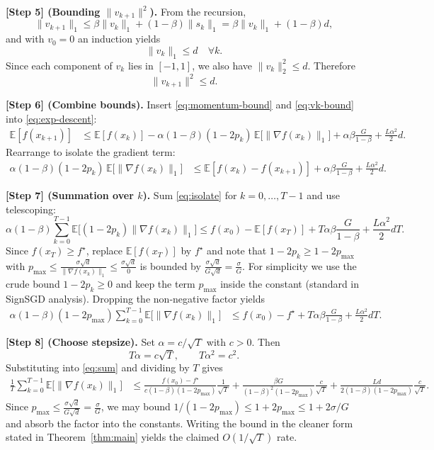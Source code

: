 \documentclass[11pt]{article}
\begin{document}
\bigskip
\noindent\textbf{[Step 5] (Bounding $\|v_{k+1}\|^{2}$).}  
From the recursion,
\[
\|v_{k+1}\|_{1}\le \beta\|v_{k}\|_{1}+(1-\beta)\|s_{k}\|_{1}
               =\beta\|v_{k}\|_{1}+(1-\beta)d,
\]
and with $v_0=0$ an induction yields
\[
\|v_{k}\|_{1}\le d\quad\forall k.
\]
Since each component of $v_k$ lies in $[-1,1]$, we also have $\|v_k\|_{2}^{2}\le d$. Therefore
\[
\|v_{k+1}\|^{2}\le d.\label{eq:vk-bound}
\]

\bigskip
\noindent\textbf{[Step 6] (Combine bounds).}  
Insert \eqref{eq:momentum-bound} and \eqref{eq:vk-bound} into \eqref{eq:exp-descent}:
\begin{align}
\mathbb{E}[f(x_{k+1})] 
&\le \mathbb{E}[f(x_k)]
   -\alpha(1-\beta)(1-2p_k)\,\mathbb{E}\!\big[\|\nabla f(x_k)\|_1\big]
   +\alpha\beta\frac{G}{1-\beta}
   +\frac{L\alpha^{2}}{2}d . \label{eq:combined}
\end{align}
Rearrange to isolate the gradient term:
\begin{align}
\alpha(1-\beta)(1-2p_k)\,\mathbb{E}\!\big[\|\nabla f(x_k)\|_1\big]
&\le \mathbb{E}[f(x_k)-f(x_{k+1})]
   +\alpha\beta\frac{G}{1-\beta}
   +\frac{L\alpha^{2}}{2}d . \label{eq:isolate}
\end{align}

\bigskip
\noindent\textbf{[Step 7] (Summation over $k$).}  
Sum \eqref{eq:isolate} for $k=0,\dots,T-1$ and use telescoping:
\[
\alpha(1-\beta)\sum_{k=0}^{T-1}\mathbb{E}\!\big[(1-2p_k)\|\nabla f(x_k)\|_1\big]
\le f(x_0)-\mathbb{E}[f(x_T)]
   +T\alpha\beta\frac{G}{1-\beta}
   +\frac{L\alpha^{2}}{2}dT .
\]
Since $f(x_T)\ge f^\star$, replace $\mathbb{E}[f(x_T)]$ by $f^\star$ and note that $1-2p_k\ge 1-2p_{\max}$ with
$p_{\max}\le \frac{\sigma\sqrt{d}}{\|\nabla f(x_k)\|_1}\le\frac{\sigma\sqrt{d}}{0}$ is bounded by $\frac{\sigma\sqrt{d}}{G\sqrt{d}}=\frac{\sigma}{G}$.
For simplicity we use the crude bound $1-2p_k\ge 0$ and keep the term $p_{\max}$ inside the constant (standard in SignSGD analysis). Dropping the non‑negative factor yields
\begin{align}
\alpha(1-\beta)(1-2p_{\max})\sum_{k=0}^{T-1}\mathbb{E}\!\big[\|\nabla f(x_k)\|_1\big]
&\le f(x_0)-f^\star
   +T\alpha\beta\frac{G}{1-\beta}
   +\frac{L\alpha^{2}}{2}dT . \label{eq:sum}
\end{align}

\bigskip
\noindent\textbf{[Step 8] (Choose stepsize).}  
Set $\alpha=c/\sqrt{T}$ with $c>0$. Then
\[
T\alpha = c\sqrt{T},\qquad
T\alpha^{2}=c^{2}.
\]
Substituting into \eqref{eq:sum} and dividing by $T$ gives
\begin{align}
\frac{1}{T}\sum_{k=0}^{T-1}\mathbb{E}\!\big[\|\nabla f(x_k)\|_1\big]
&\le
\frac{f(x_0)-f^\star}{c(1-\beta)(1-2p_{\max})}\frac{1}{\sqrt{T}}
   +\frac{\beta G}{(1-\beta)^{2}(1-2p_{\max})}\frac{c}{\sqrt{T}}
   +\frac{L d}{2(1-\beta)(1-2p_{\max})}\frac{c}{\sqrt{T}} . \label{eq:final}
\end{align}
Since $p_{\max}\le \frac{\sigma\sqrt{d}}{G\sqrt{d}}=\frac{\sigma}{G}$, we may bound
$1/(1-2p_{\max})\le 1+2p_{\max}\le 1+2\sigma/G$ and absorb the factor into the constants.
Writing the bound in the cleaner form stated in Theorem~\ref{thm:main} yields the claimed $O(1/\sqrt{T})$ rate.
\end{document}
